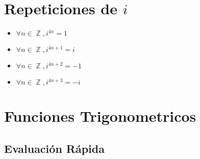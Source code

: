 \documentclass[12pt, fleqn]{report}                             %
\DeclareMathOperator \Integers  {\mathbb{Z}}                     %
\begin{document}
        \section{Repeticiones de $i$} 

            \begin{itemize}
                \item $\forall n \in \Integers, i^{4n} = 1$
                \item $\forall n \in \Integers, i^{4n+1} = i$
                \item $\forall n \in \Integers, i^{4n+2} = -1$
                \item $\forall n \in \Integers, i^{4n+3} = -i$
            \end{itemize}




        \clearpage
        \section{Funciones Trigonometricos}

            \subsection{Evaluación Rápida}
\end{document}
